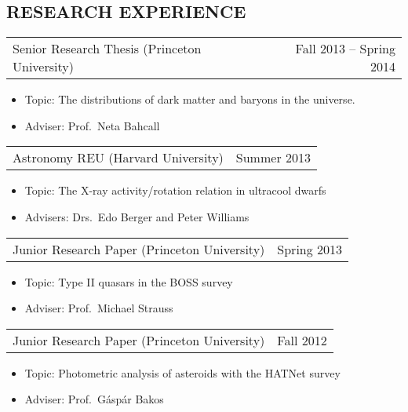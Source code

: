 \documentclass[margin]{res}
\begin{document}
\begin{resume}
\section{RESEARCH EXPERIENCE}
				 \begin{tabular}{@{}p{4in} r}
				 Senior Research Thesis (Princeton
                                 University) & Fall 2013 -- Spring
                                 2014
				 \end{tabular}
				 \begin{itemize} \itemsep -2pt
				 \item[] Topic: The distributions of
                                   dark matter and baryons in the
                                   universe.
				 \item[] Adviser: Prof.~Neta Bahcall
				 \end{itemize}
				 \begin{tabular}{@{}p{4in} r}
				 Astronomy REU (Harvard University) &
                                 Summer 2013
				 \end{tabular}
				 \begin{itemize} \itemsep -2pt
				 \item[] Topic: The X-ray
                                   activity/rotation relation in
                                   ultracool dwarfs
				 \item[] Advisers: Drs.~Edo Berger and
                                   Peter Williams
				 \end{itemize}
				 \begin{tabular}{@{}p{4in} r}
				 Junior Research Paper (Princeton
                                 University) & Spring 2013
				 \end{tabular}
				 \begin{itemize} \itemsep -2pt
				 \item[] Topic: Type II quasars in the
                                   BOSS survey
				 \item[] Adviser: Prof.~Michael Strauss
				 \end{itemize}
				 \begin{tabular}{@{}p{4in} r}
				 Junior Research Paper (Princeton
                                 University) & Fall 2012
				 \end{tabular}
				 \begin{itemize} \itemsep -2pt
				 \item[] Topic: Photometric analysis
                                   of asteroids with the HATNet survey
				 \item[] Adviser: Prof.~G\'asp\'ar Bakos

\end{itemize}
\end{resume}
\end{document}
